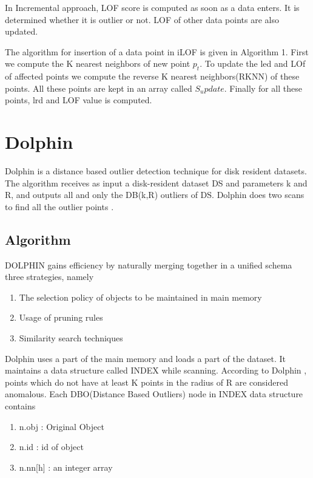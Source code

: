 In Incremental approach, LOF score is computed as soon as a data enters. It is determined whether it is outlier or not. LOF of other data points are also updated. 


The algorithm for insertion of a data point in iLOF is given in Algorithm 1. First we compute the K nearest neighbors of new point $p_t$. To update the led and LOf of affected points we compute the reverse K nearest neighbors(RKNN) of these points. All these points are kept in an array called $S_update$. Finally for all these points, lrd and LOF value is computed.  

	

\section{Dolphin}

Dolphin is a distance based outlier detection technique for disk resident datasets. The algorithm receives
as input a disk-resident dataset DS and parameters k and R, and outputs all
and only the DB(k,R) outliers of DS. Dolphin does two scans to find all the outlier points \cite{e}.

\subsection{Algorithm}

DOLPHIN gains efficiency by naturally merging together in a unified
schema three strategies, namely

\begin{enumerate}
	\item 
	The selection policy of objects to be maintained in main memory
	
	\item Usage of pruning rules
	\item Similarity search techniques
\end{enumerate}


Dolphin uses a part of the main memory and loads a part of the dataset. It maintains a data structure called INDEX while scanning. According to Dolphin , points which do not have at least K points in the radius of R are considered anomalous. Each DBO(Distance Based Outliers) node in INDEX data structure contains

\begin{enumerate}
	\item n.obj : Original Object 
	\item n.id : id of object 
	\item n.nn[h] : an integer array  
\end{enumerate}

